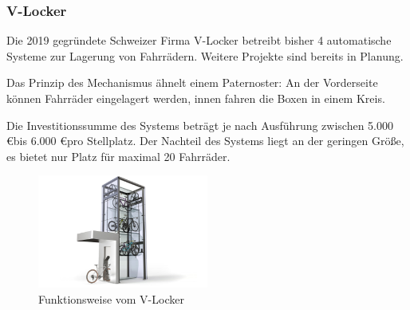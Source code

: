 \subsubsection{V-Locker}
Die 2019 gegründete Schweizer Firma V-Locker betreibt bisher 4 automatische Systeme zur Lagerung von Fahrrädern.  Weitere Projekte sind bereits in Planung. 

\noindent Das Prinzip des Mechanismus ähnelt einem Paternoster: An der Vorderseite können Fahrräder eingelagert werden, innen fahren die Boxen in einem Kreis.

\noindent Die Investitionssumme des Systems beträgt je nach Ausführung zwischen 5.000 \euro bis 6.000 \euro pro Stellplatz.  Der Nachteil des Systems liegt an der geringen Größe, es bietet nur Platz für maximal 20 Fahrräder.

\begin{figure}[H]
    \centering
    \includegraphics[width=0.5\textwidth]{images/vlocker.png}
    \caption{Funktionsweise vom V-Locker }
    \label{fig:vlocker}
\end{figure}

